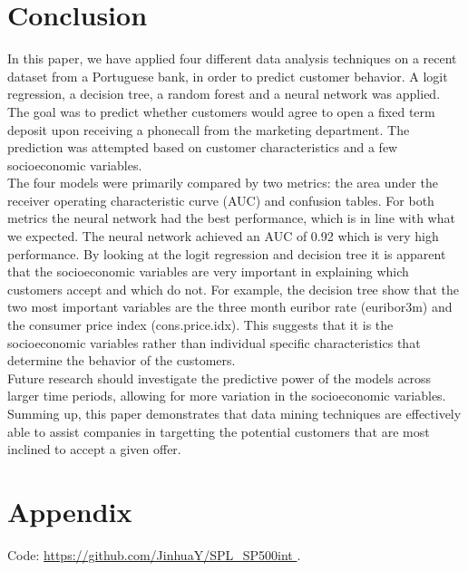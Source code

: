  \newpage
 \pagestyle{fancy}
 \section{Conclusion}
 \noindent In this paper, we have applied four different data analysis techniques on a recent dataset from a Portuguese bank, in order to predict customer behavior. A logit regression, a decision tree, a random forest and a neural network was applied. The goal was to predict whether customers would agree to open a fixed term deposit upon receiving a phonecall from the marketing department. The prediction was attempted based on customer characteristics and a few socioeconomic variables.\\
 The four models were primarily compared by two metrics: the area under the receiver operating characteristic curve (AUC) and confusion tables. For both metrics the neural network had the best performance, which is in line with what we expected. The neural network achieved an AUC of 0.92 which is very high performance. By looking at the logit regression and decision tree it is apparent that the socioeconomic variables are very important in explaining which customers accept and which do not. For example, the decision tree show that the two most important variables are the three month euribor rate (euribor3m) and the consumer price index (cons.price.idx). This suggests that it is the socioeconomic variables rather than individual specific characteristics that determine the behavior of the customers.\\
 Future research should investigate the predictive power of the models across larger time periods, allowing for more variation in the socioeconomic variables.\\
 Summing up, this paper demonstrates that data mining techniques are effectively able to assist companies in targetting the potential customers that are most inclined to accept a given offer. 
 
 \newpage
\pagestyle{fancy}



\newpage
\pagestyle{fancy}
    \section*{Appendix}
 \noindent Code:  \url{https://github.com/JinhuaY/SPL_SP500int 
}.\\

 

